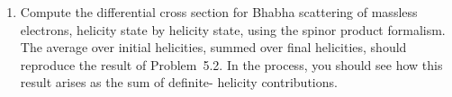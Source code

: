 \begin{enumerate}[label=(\alph*)]
    \begin{equation}
      \frac{d\sigma}{d\cos\theta}(e^{-}_R e^{+}_L \to \mu^{-}_R\mu^{+}_L)
    \end{equation}
    given in Eq.~\eqref{eq:5.21}.  Compute the other helicity cross sections
    for this process and show that they also reproduce the results found in
    Section~5.2.
  \item Compute the differential cross section for Bhabha scattering of
    massless electrons, helicity state by helicity state, using the spinor
    product formalism.  The average over initial helicities, summed over
    final helicities, should reproduce the result of Problem~5.2.  In the
    process, you should see how this result arises as the sum of definite-
    helicity contributions.
\end{enumerate}

